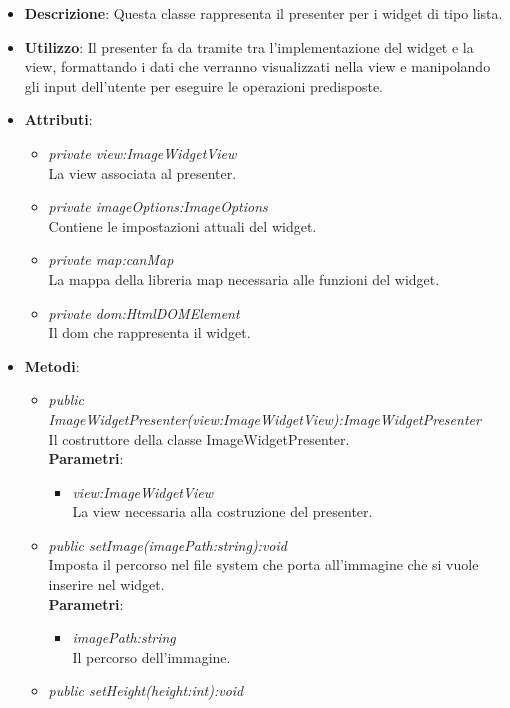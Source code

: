\begin{itemize}
\item \textbf{Descrizione}: Questa classe rappresenta il presenter per i widget di tipo lista.
\item \textbf{Utilizzo}: Il presenter fa da tramite tra l'implementazione del widget e la view, formattando i dati che verranno visualizzati nella view e manipolando gli input dell'utente per eseguire le operazioni predisposte.
\item \textbf{Attributi}:
	\begin{itemize}
	\item \textit{private view:ImageWidgetView}\\
	La view associata al presenter.
	\item \textit{private imageOptions:ImageOptions}\\
	Contiene le impostazioni attuali del widget.
	\item \textit{private map:canMap}\\
	La mappa della libreria map necessaria alle funzioni del widget.
	\item \textit{private dom:HtmlDOMElement}\\
	Il dom che rappresenta il widget.
	\end{itemize}
\item \textbf{Metodi}:
	\begin{itemize}
	\item \textit{public ImageWidgetPresenter(view:ImageWidgetView):ImageWidgetPresenter}\\
	Il costruttore della classe ImageWidgetPresenter.
		\\ \textbf{Parametri}: \begin{itemize}
		\item \textit{view:ImageWidgetView}\\
		La view necessaria alla costruzione del presenter.
		\end{itemize}
	\item \textit{public setImage(imagePath:string):void}\\
	Imposta il percorso nel file system che porta all'immagine che si vuole inserire nel widget.
		\\ \textbf{Parametri}: \begin{itemize}
		\item \textit{imagePath:string}\\
		Il percorso dell'immagine.
		\end{itemize} 
	\item \textit{public setHeight(height:int):void}\\

\end{itemize}
\end{itemize}
